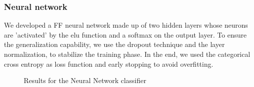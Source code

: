 \subsubsection{Neural network}
We developed a FF neural network made up of two hidden layers whose neurons are 'activated' by the elu function and a softmax on the output layer. To ensure the generalization capability, we use the dropout technique and the layer normalization, to stabilize the training phase. In the end, we used the categorical cross entropy as loss function and early stopping to avoid overfitting.
\begin{figure}[H]
    \centering
    \caption{Results for the Neural Network classifier}
    \label{fig:NNResults}
\end{figure}

